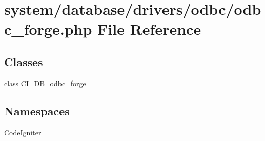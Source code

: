 \hypertarget{odbc__forge_8php}{}\section{system/database/drivers/odbc/odbc\+\_\+forge.php File Reference}
\label{odbc__forge_8php}
\subsection*{Classes}
\begin{DoxyCompactItemize}
\item 
class \mbox{\hyperlink{class_c_i___d_b__odbc__forge}{C\+I\+\_\+\+D\+B\+\_\+odbc\+\_\+forge}}
\end{DoxyCompactItemize}
\subsection*{Namespaces}
\begin{DoxyCompactItemize}
\item 
 \mbox{\hyperlink{namespace_code_igniter}{Code\+Igniter}}
\end{DoxyCompactItemize}
